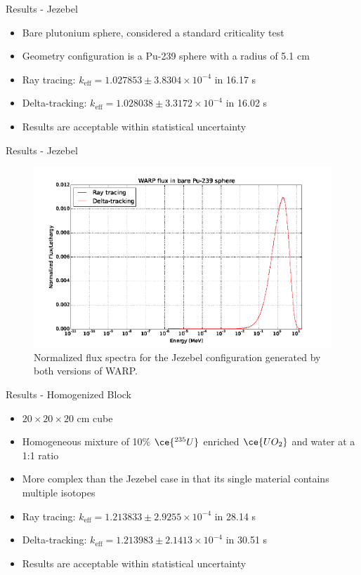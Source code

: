 \documentclass[xcolor=x11names,compress, handout]{beamer}
\renewcommand{\(}{\begin{columns}}
\renewcommand{\)}{\end{columns}}
\newcommand{\<}[1]{\begin{column}{#1}}
\renewcommand{\>}{\end{column}}
\begin{document}
\begin{frame}{Results - Jezebel}
	\begin{itemize}
	\pause
	\item{Bare plutonium sphere, considered a standard criticality test \cite{nea1995}}
	\pause
	\item{Geometry configuration is a Pu-239 sphere with a radius of 5.1 cm}
	\pause
	\item{Ray tracing: $k_{\mathrm{eff}} = 1.027853 \pm 3.8304 \times 10^{-4}$ in 16.17 s}
	\pause
	\item{Delta-tracking: $k_{\mathrm{eff}} = 1.028038 \pm 3.3172 \times 10^{-4}$ in 16.02 s}
	\pause
	\item{Results are acceptable within statistical uncertainty}
	\end{itemize}
\end{frame}


\begin{frame}{Results - Jezebel}
	\begin{figure}[h!]
	\includegraphics[width=0.9\linewidth]{../figs/godiva}
	\caption{Normalized flux spectra for the Jezebel configuration generated by both versions of WARP.
	\label{godiva}}
	\end{figure}
\end{frame}

\begin{frame}{Results - Homogenized Block}
	\begin{itemize}
	\pause
	\item{$20\times20\times20$ cm cube}
	\pause
	\item{Homogeneous mixture of 10\% $\ce{^{235}U}$ enriched $\ce{UO_2}$ and water at a 1:1 ratio}
	\pause
	\item{More complex than the Jezebel case in that its single material contains multiple isotopes}
	\pause
	\item{Ray tracing: $k_{\mathrm{eff}} = 1.213833 \pm 2.9255 \times 10^{-4}$ in 28.14 s}
	\pause
	\item{Delta-tracking: $k_{\mathrm{eff}} = 1.213983 \pm 2.1413 \times 10^{-4}$ in 30.51 s}
	\pause
	\item{Results are acceptable within statistical uncertainty}
	\end{itemize}
\end{frame}
\end{document}
